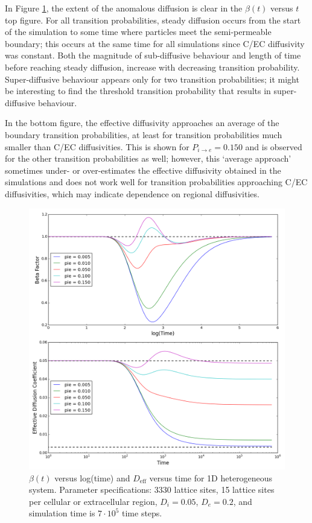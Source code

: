	 In Figure \ref{fig:pie_beta_deff_1D}, the extent of the anomalous diffusion is clear in the $ \beta (t) $ versus $ t $ top figure. For all transition probabilities, steady diffusion occurs from the start of the simulation to some time where particles meet the semi-permeable boundary; this occurs at the same time for all simulations since C/EC diffusivity was constant. Both the magnitude of sub-diffusive behaviour and length of time before reaching steady diffusion, increase with decreasing transition probability. Super-diffusive behaviour appears only for two transition probabilities; it might be interesting to find the threshold transition probability that results in super-diffusive behaviour.
	 
	 In the bottom figure, the effective diffusivity approaches an average of the boundary transition probabilities, at least for transition probabilities much smaller than C/EC diffusivities. This is shown for $ P_{i \rightarrow e} = 0.150 $ and is observed for the other transition probabilities as well; however, this `average approach' sometimes under- or over-estimates the effective diffusivity obtained in the simulations and does not work well for transition probabilities approaching C/EC diffusivities, which may indicate dependence on regional diffusivities.
	
	\begin{figure}[h!]
		\centering
		\includegraphics[width=1.0\linewidth]{../images/1D/pie_beta_deff_1D}
		\caption{$ \beta (t) $ versus log(time) and $ D_\textrm{eff} $ versus time for 1D heterogeneous system. Parameter specifications: 3330 lattice sites, 15 lattice sites per cellular or extracellular region, $ D_i = 0.05 $, $ D_e = 0.2 $, and simulation time is $ 7\cdot 10^5 $ time steps.}
		\label{fig:pie_beta_deff_1D}
	\end{figure}

